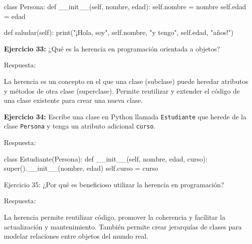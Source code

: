 \documentclass[
  a4paper,
  onepage,
  openany]{scrreprt}
\newenvironment{Shaded}{\begin{snugshade}}{\end{snugshade}}
\newcommand{\BuiltInTok}[1]{\textcolor[rgb]{0.00,0.23,0.31}{#1}}
\newcommand{\FunctionTok}[1]{\textcolor[rgb]{0.28,0.35,0.67}{#1}}
\newcommand{\KeywordTok}[1]{\textcolor[rgb]{0.00,0.23,0.31}{#1}}
\newcommand{\NormalTok}[1]{\textcolor[rgb]{0.00,0.23,0.31}{#1}}
\newcommand{\OperatorTok}[1]{\textcolor[rgb]{0.37,0.37,0.37}{#1}}
\newcommand{\StringTok}[1]{\textcolor[rgb]{0.13,0.47,0.30}{#1}}
\newcommand{\VariableTok}[1]{\textcolor[rgb]{0.07,0.07,0.07}{#1}}
\begin{document}
\begin{Shaded}
\begin{Highlighting}[]
\KeywordTok{class}\NormalTok{ Persona:}
    \KeywordTok{def} \FunctionTok{\_\_init\_\_}\NormalTok{(}\VariableTok{self}\NormalTok{, nombre, edad):}
        \VariableTok{self}\NormalTok{.nombre }\OperatorTok{=}\NormalTok{ nombre}
        \VariableTok{self}\NormalTok{.edad }\OperatorTok{=}\NormalTok{ edad}
\end{Highlighting}
\end{Shaded}

\begin{Shaded}
\begin{Highlighting}[]
\KeywordTok{def}\NormalTok{ saludar(}\VariableTok{self}\NormalTok{):}
    \BuiltInTok{print}\NormalTok{(}\StringTok{"¡Hola, soy"}\NormalTok{, }\VariableTok{self}\NormalTok{.nombre, }\StringTok{"y tengo"}\NormalTok{, }\VariableTok{self}\NormalTok{.edad, }\StringTok{"años!"}\NormalTok{)}
\end{Highlighting}
\end{Shaded}

\textbf{Ejercicio 33:} ¿Qué es la herencia en programación orientada a
objetos?

Respuesta:

La herencia es un concepto en el que una clase (subclase) puede heredar
atributos y métodos de otra clase (superclase). Permite reutilizar y
extender el código de una clase existente para crear una nueva clase.

\textbf{Ejercicio 34:} Escribe una clase en Python llamada
\texttt{Estudiante} que herede de la clase \texttt{Persona} y tenga un
atributo adicional \texttt{curso}.

Respuesta:

\begin{Shaded}
\begin{Highlighting}[]
\KeywordTok{class}\NormalTok{ Estudiante(Persona):}
    \KeywordTok{def} \FunctionTok{\_\_init\_\_}\NormalTok{(}\VariableTok{self}\NormalTok{, nombre, edad, curso):}
        \BuiltInTok{super}\NormalTok{().}\FunctionTok{\_\_init\_\_}\NormalTok{(nombre, edad)}
        \VariableTok{self}\NormalTok{.curso }\OperatorTok{=}\NormalTok{ curso}
\end{Highlighting}
\end{Shaded}

Ejercicio 35: ¿Por qué es beneficioso utilizar la herencia en
programación?

Respuesta:

La herencia permite reutilizar código, promover la coherencia y
facilitar la actualización y mantenimiento. También permite crear
jerarquías de clases para modelar relaciones entre objetos del mundo
real.
\end{document}
